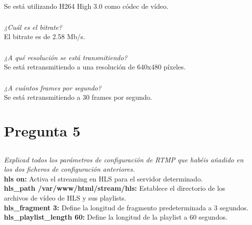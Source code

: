 \documentclass[spanish]{article}
\begin{document}
Se está utilizando H264 High 3.0 como códec de vídeo.

\subsubsection{}

\textit{¿Cuál es el bitrate?}\\

El bitrate es de 2.58 Mb/s.

\subsubsection{}

\textit{¿A qué resolución se está transmitiendo?}\\

Se está retransmitiendo a una resolución de 640x480 píxeles.

\subsubsection{}

\textit{¿A cuántos frames por segundo?}\\

Se está retransmitiendo a 30 frames por segundo.

\section{Pregunta 5}

\subsection{}

\textit{Explicad todos los parámetros de configuración de RTMP que
habéis añadido en los dos ficheros de configuración
anteriores.}\\

\textbf{hls on:} Activa el streaming en HLS para el servidor
determinado.\\

\textbf{hls\_path /var/www/html/stream/hls:} Establece el directorio
de los archivos de vídeo de HLS y sus playlists.\\

\textbf{hls\_fragment 3:} Define la longitud de fragmento
predeterminada a 3 segundos.\\

\textbf{hls\_playlist\_length 60:} Define la longitud de la playlist
a 60 segundos.\\
\end{document}
